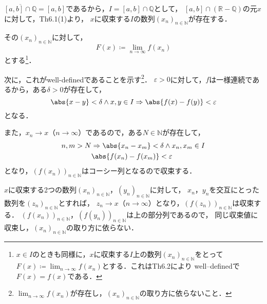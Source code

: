 

\begin{tproof}
    $\overline{[a,b] \cap \mathbb{Q}}=[a,b]$であるから，$I=[a,b] \cap \mathbb{Q}$として，
    $[a,b] \cap (\mathbb{R}-\mathbb{Q})$の元$x$に対して，Th6.1(1)より，
    $x$に収束する$I$の数列$(x_n)_{n \in \mathbb{N}}$が存在する．

    その$(x_n)_{n \in \mathbb{N}}$に対して，
    \[
        F(x)\coloneqq \lim_{n \to \infty} f(x_n)
    \]
    とする\footnote{$x \in I$のときも同様に，$x$に収束する$I$上の数列$(x_n)_{n \in \mathbb{N}}$をとって$F(x)\coloneqq \lim_{n \to \infty} f(x_n)$とする．これはTh6.2により well--definedで$F(x)=f(x)$である．}．

    次に，これがwell-definedであることを示す\footnote{$\lim_{n \to \infty} f(x_n)$が存在し，$(x_n)_{n \in \mathbb{N}}$の取り方に依らないこと．}．
    $\varepsilon >0$に対して，$f$は一様連続であるから，ある$\delta >0$が存在して，
    \[
        \abs{x-y}<\delta \land x,y \in I \Rightarrow \abs{f(x)-f(y)}<\varepsilon
    \]
    となる．

    また，$x_n \to x$（$n \to \infty$）であるので，ある$N \in \mathbb{N}$が存在して，
    \begin{align*}
        n, m > N & \Rightarrow \abs{x_n-x_m}<\delta \land x_n,x_m \in I \\
                 & \abs{f(x_n)-f(x_m)}<\varepsilon
    \end{align*}
    となり，$(f(x_n))_{n \in \mathbb{N}}$はコーシー列となるので収束する．

    $x$に収束する2つの数列$(x_n)_{n \in \mathbb{N}}$，$(y_n)_{n \in \mathbb{N}}$に対して，
    $x_n$，$y_n$を交互にとった数列を$(z_n)_{n \in \mathbb{N}}$とすれば，
    $z_n \to x$（$n \to \infty$）となり，$(f(z_n))_{n \in \mathbb{N}}$は収束する．
    $(f(x_n))_{n \in \mathbb{N}}$，$(f(y_n))_{n \in \mathbb{N}}$は上の部分列であるので，
    同じ収束値に収束し，$(x_n)_{n \in \mathbb{N}}$の取り方に依らない．
\end{tproof}

